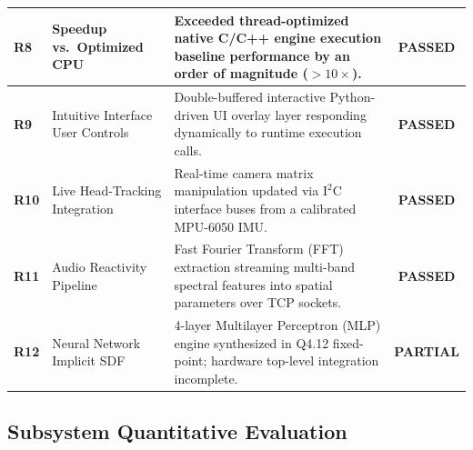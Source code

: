 \begin{table}[htbp]
\begin{tabularx}{\textwidth}{l|l|X|c}
\textbf{R8} & Speedup vs.\ Optimized CPU & Exceeded thread-optimized native C/C++ engine execution baseline performance by an order of magnitude ($>10\times$). & \textbf{PASSED} \\ \hline
\textbf{R9} & Intuitive Interface User Controls & Double-buffered interactive Python-driven UI overlay layer responding dynamically to runtime execution calls. & \textbf{PASSED} \\ \hline
\textbf{R10} & Live Head-Tracking Integration & Real-time camera matrix manipulation updated via $\text{I}^2\text{C}$ interface buses from a calibrated MPU-6050 IMU. & \textbf{PASSED} \\ \hline
\textbf{R11} & Audio Reactivity Pipeline & Fast Fourier Transform (FFT) extraction streaming multi-band spectral features into spatial parameters over TCP sockets. & \textbf{PASSED} \\ \hline
\textbf{R12} & Neural Network Implicit SDF & 4-layer Multilayer Perceptron (MLP) engine synthesized in Q4.12 fixed-point; hardware top-level integration incomplete. & \textbf{PARTIAL} \\ 
\bottomrule
\end{tabularx}
\end{table}

\subsection{Subsystem Quantitative Evaluation}
\label{sec:subsystem_eval}

